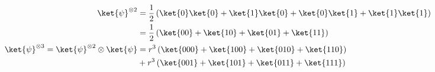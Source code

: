\begin{align}
\ket{\psi}^{\otimes 2} &= \frac{1}{2} \left( \ket{0} \ket{0} + \ket{1} \ket{0} +
\ket{0} \ket{1} + \ket{1} \ket{1} \right) \\
&= \frac{1}{2} \left( \ket{00} + \ket{10} + \ket{01} + \ket{11} \right) \\
\ket{\psi}^{\otimes 3} = \ket{\psi}^{\otimes 2} \otimes \ket{\psi} &= r^3 \left(
\ket{000} + \ket{100} + \ket{010} + \ket{110} \right) \\
&+ r^3 \left( \ket{001} + \ket{101} + \ket{011} + \ket{111} \right)
\end{align}
